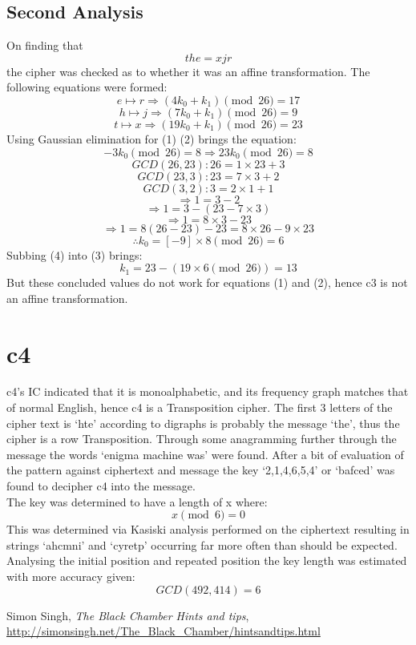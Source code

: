 \documentclass{article}
\begin{document}
      \subsection{Second Analysis}
      On finding that \[ the = xjr \] the cipher was checked as to whether it was an affine transformation. The 
      following equations were formed:
      \begin{equation}
        e \mapsto r \Rightarrow (4 k_0 + k_1) \pmod{26} = 17
      \end{equation}
      \begin{equation}
        h \mapsto j \Rightarrow (7 k_0 + k_1) \pmod{26} = 9
      \end{equation}
      \begin{equation}
        t \mapsto x \Rightarrow (19 k_0 + k_1) \pmod{26} = 23
       \end{equation}
       Using Gaussian elimination for (1) \- (2) brings the equation:
       \begin{equation}
         -3 k_0 \pmod{26} = 8 \Rightarrow 23 k_0 \pmod{26} = 8
       \end{equation}
       \[ GCD(26,23): 26 = 1 \times 23 + 3 \]
       \[ GCD(23,3):  23 = 7 \times 3 + 2 \] 
       \[ GCD(3,2): 3 = 2 \times 1 + 1 \] 
       \[ \Rightarrow 1 = 3 - 2 \] 
       \[ \Rightarrow 1 = 3 - (23 - 7 \times 3) \] 
       \[ \Rightarrow 1 = 8 \times 3 - 23 \] 
       \[ \Rightarrow 1 = 8(26 - 23) - 23 = 8 \times 26 - 9 \times 23 \]
       \begin{equation}
         \therefore k_0 = [-9] \times 8 \pmod{26} = 6
       \end{equation}
       Subbing (4) into (3) brings:
       \begin{equation}
         k_1 = 23 - (19 \times 6 \pmod{26}) = 13
       \end{equation}
       But these concluded values do not work for equations (1) and (2), hence c3 is not an affine transformation.
      \section{c4}
      c4's IC indicated that it is monoalphabetic, and its frequency graph matches that
      of normal English, hence c4 is a Transposition cipher. The first 3 letters of the
      cipher text is `hte' according to digraphs is probably the message `the', thus the
      cipher is a row Transposition. Through some anagramming further through the message 
      the words `enigma machine was' were found. After a bit of evaluation of the pattern 
      against ciphertext and message the key `2,1,4,6,5,4' or `bafced' was found to decipher 
      c4 into the message. \\
      The key was determined to have a length of x where: \[ x \pmod 6 = 0 \]
      This was determined via Kasiski analysis performed on the ciphertext resulting in strings 
      `ahcmni' and `cyretp' occurring far more often than should be expected.
      Analysing the initial position and repeated position the key length was estimated
      with more accuracy given: \[ GCD(492,414) = 6 \]

      \begin{thebibliography}{9}
          Simon Singh,
          \textit{The Black Chamber \- Hints and tips},
          \url{http://simonsingh.net/The_Black_Chamber/hintsandtips.html}
      \end{thebibliography}
  
\end{document}
